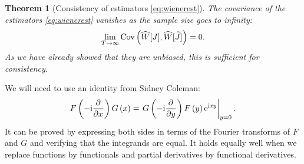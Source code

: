 \documentclass[12pt]{article}
\theoremstyle{slplain}
\newtheorem{thm}{Theorem}
\theoremstyle{sldefinition}
\theoremstyle{remark}
\newcommand{\tj}{\widetilde{J}}
\newcommand{\hw}{\widehat{W}}
\begin{document}
\begin{thm}[Consistency of estimators \eqref{eq:wienerest}]
  The covariance of the estimators \eqref{eq:wienerest} vanishes as the sample size goes to infinity:
  \begin{equation}\label{eq:wienercons}
    \lim_{T\to\infty} \cov\prn{ \hw[J], \hw[\tj] } = 0.
  \end{equation}
  As we have already showed that they are unbiased, this is sufficient for consistency.
\label{th:wienercons}
\end{thm}
%
We will need to use an identity from Sidney Coleman:
%
\begin{equation}\label{eq:coleman}
  F\prn{-\ir\pdiff{}{x}} G\prn{x} = \left. G\prn{-\ir\pdiff{}{y}} F\prn{y} \e^{\ir x \cdt y} \right|_{y=0}.
\end{equation}
%
It can be proved by expressing both sides in terms of the Fourier transforms of $F$ and $G$ and verifying that the integrands are equal. It holds equally well when we replace functions by functionals and partial derivatives by functional derivatives.
%
\end{document}
